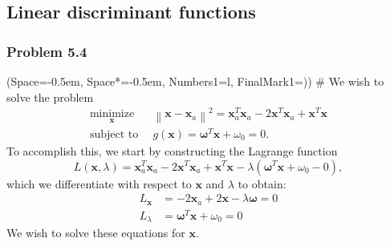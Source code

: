 \documentclass[12pt, a4paper]{article}
\newcommand{\listSpace}{-0.5em}%
\newcommand{\vect}[1]{\bm{#1}}
\newcommand{\norm}[1]{\left\lVert#1\right\rVert}
\begin{document}
\clearpage
\subsection{Linear discriminant functions}

\subsubsection*{Problem 5.4}
\begin{easylist}[enumerate]
	\ListProperties(Space=\listSpace, Space*=\listSpace, Numbers1=l, FinalMark1={)})
	# We wish to solve the problem
	\begin{align*}
	\underset{\vect{x}}{\operatorname{minimize}} \, & \norm{\vect{x} - \vect{x}_a}^2 =
		\vect{x}_a^T \vect{x}_a - 2\vect{x}^T \vect{x}_a + \vect{x}^T \vect{x} \\
		\text{subject to } \, & g(\vect{x}) = \vect{\omega}^T \vect{x} + \omega_0 = 0.
	\end{align*}
	To accomplish this, we start by constructing the Lagrange function
	\begin{equation*}
		L(\vect{x}, \lambda) = \vect{x}_a^T \vect{x}_a - 2\vect{x}^T \vect{x}_a + \vect{x}^T \vect{x} - \lambda( \vect{\omega}^T \vect{x} + \omega_0 - 0 ),
	\end{equation*}
	which we differentiate with respect to $\vect{x}$ and $\lambda$ to obtain:
	\begin{align*}
		L_{\vect{x}} &= -2 \vect{x}_a + 2 \vect{x} - \lambda \vect{\omega} = 0 \\
		L_\lambda &= \vect{\omega}^T \vect{x} + \omega_0 = 0
	\end{align*}
	We wish to solve these equations for $\vect{x}$.
	

\end{easylist}
\end{document}
